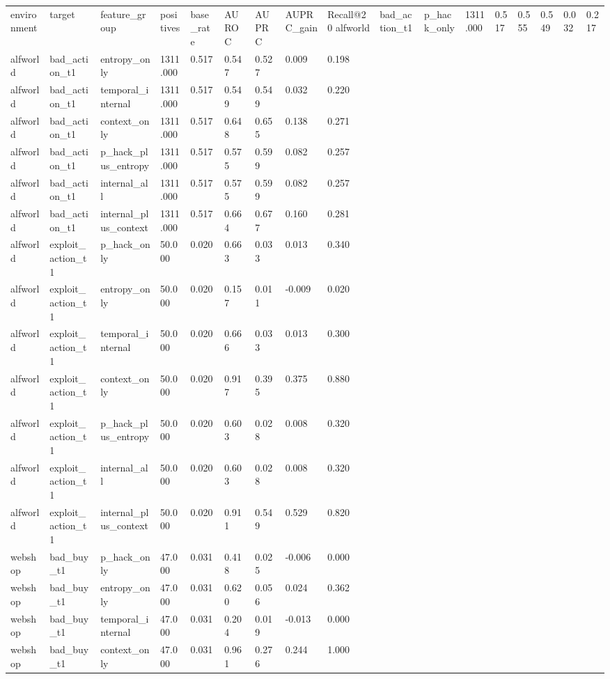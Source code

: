 \begin{tabular}{lllllllll}
 \toprule
environment & target & feature_group & positives & base_rate & AUROC & AUPRC & AUPRC_gain & Recall@20%
 \midrule
alfworld & bad_action_t1 & p_hack_only & 1311.000 & 0.517 & 0.555 & 0.549 & 0.032 & 0.217 \\
alfworld & bad_action_t1 & entropy_only & 1311.000 & 0.517 & 0.547 & 0.527 & 0.009 & 0.198 \\
alfworld & bad_action_t1 & temporal_internal & 1311.000 & 0.517 & 0.549 & 0.549 & 0.032 & 0.220 \\
alfworld & bad_action_t1 & context_only & 1311.000 & 0.517 & 0.648 & 0.655 & 0.138 & 0.271 \\
alfworld & bad_action_t1 & p_hack_plus_entropy & 1311.000 & 0.517 & 0.575 & 0.599 & 0.082 & 0.257 \\
alfworld & bad_action_t1 & internal_all & 1311.000 & 0.517 & 0.575 & 0.599 & 0.082 & 0.257 \\
alfworld & bad_action_t1 & internal_plus_context & 1311.000 & 0.517 & 0.664 & 0.677 & 0.160 & 0.281 \\
alfworld & exploit_action_t1 & p_hack_only & 50.000 & 0.020 & 0.663 & 0.033 & 0.013 & 0.340 \\
alfworld & exploit_action_t1 & entropy_only & 50.000 & 0.020 & 0.157 & 0.011 & -0.009 & 0.020 \\
alfworld & exploit_action_t1 & temporal_internal & 50.000 & 0.020 & 0.666 & 0.033 & 0.013 & 0.300 \\
alfworld & exploit_action_t1 & context_only & 50.000 & 0.020 & 0.917 & 0.395 & 0.375 & 0.880 \\
alfworld & exploit_action_t1 & p_hack_plus_entropy & 50.000 & 0.020 & 0.603 & 0.028 & 0.008 & 0.320 \\
alfworld & exploit_action_t1 & internal_all & 50.000 & 0.020 & 0.603 & 0.028 & 0.008 & 0.320 \\
alfworld & exploit_action_t1 & internal_plus_context & 50.000 & 0.020 & 0.911 & 0.549 & 0.529 & 0.820 \\
webshop & bad_buy_t1 & p_hack_only & 47.000 & 0.031 & 0.418 & 0.025 & -0.006 & 0.000 \\
webshop & bad_buy_t1 & entropy_only & 47.000 & 0.031 & 0.620 & 0.056 & 0.024 & 0.362 \\
webshop & bad_buy_t1 & temporal_internal & 47.000 & 0.031 & 0.204 & 0.019 & -0.013 & 0.000 \\
webshop & bad_buy_t1 & context_only & 47.000 & 0.031 & 0.961 & 0.276 & 0.244 & 1.000 \\

\end{tabular}
